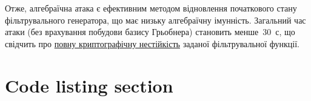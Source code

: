 Отже, алгебраїчна атака є ефективним методом відновлення початкового стану фільтрувального генератора, що має 
низьку алгебраїчну імунність. Загальний час атаки (без врахування побудови базису Грьобнера) становить менше~30~с, 
що свідчить про \underline{повну криптографічну нестійкість} заданої фільтрувальної функції.

\section{Code listing section}


